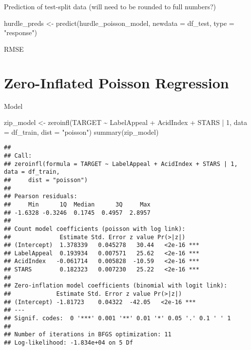 \documentclass[
]{article}
\newenvironment{Shaded}{\begin{snugshade}}{\end{snugshade}}
\newcommand{\AttributeTok}[1]{\textcolor[rgb]{0.77,0.63,0.00}{#1}}
\newcommand{\DecValTok}[1]{\textcolor[rgb]{0.00,0.00,0.81}{#1}}
\newcommand{\FunctionTok}[1]{\textcolor[rgb]{0.00,0.00,0.00}{#1}}
\newcommand{\NormalTok}[1]{#1}
\newcommand{\OtherTok}[1]{\textcolor[rgb]{0.56,0.35,0.01}{#1}}
\newcommand{\SpecialCharTok}[1]{\textcolor[rgb]{0.00,0.00,0.00}{#1}}
\newcommand{\StringTok}[1]{\textcolor[rgb]{0.31,0.60,0.02}{#1}}
\begin{document}
Prediction of test-split data (will need to be rounded to full numbers?)

\begin{Shaded}
\begin{Highlighting}[]
\NormalTok{hurdle\_preds }\OtherTok{\textless{}{-}} \FunctionTok{predict}\NormalTok{(hurdle\_poisson\_model, }\AttributeTok{newdata =}\NormalTok{ df\_test, }\AttributeTok{type =} \StringTok{"response"}\NormalTok{)}
\end{Highlighting}
\end{Shaded}

RMSE

\begin{Shaded}
\end{Shaded}

\hypertarget{zero-inflated-poisson-regression}{%
\section{Zero-Inflated Poisson
Regression}\label{zero-inflated-poisson-regression}}

Model

\begin{Shaded}
\begin{Highlighting}[]
\NormalTok{zip\_model }\OtherTok{\textless{}{-}} \FunctionTok{zeroinfl}\NormalTok{(TARGET }\SpecialCharTok{\textasciitilde{}}\NormalTok{ LabelAppeal }\SpecialCharTok{+}\NormalTok{ AcidIndex }\SpecialCharTok{+}\NormalTok{ STARS }\SpecialCharTok{|} \DecValTok{1}\NormalTok{, }\AttributeTok{data =}\NormalTok{ df\_train, }\AttributeTok{dist =} \StringTok{"poisson"}\NormalTok{)}
\FunctionTok{summary}\NormalTok{(zip\_model)}
\end{Highlighting}
\end{Shaded}

\begin{verbatim}
## 
## Call:
## zeroinfl(formula = TARGET ~ LabelAppeal + AcidIndex + STARS | 1, data = df_train, 
##     dist = "poisson")
## 
## Pearson residuals:
##     Min      1Q  Median      3Q     Max 
## -1.6328 -0.3246  0.1745  0.4957  2.8957 
## 
## Count model coefficients (poisson with log link):
##              Estimate Std. Error z value Pr(>|z|)    
## (Intercept)  1.378339   0.045278   30.44   <2e-16 ***
## LabelAppeal  0.193934   0.007571   25.62   <2e-16 ***
## AcidIndex   -0.061714   0.005828  -10.59   <2e-16 ***
## STARS        0.182323   0.007230   25.22   <2e-16 ***
## 
## Zero-inflation model coefficients (binomial with logit link):
##             Estimate Std. Error z value Pr(>|z|)    
## (Intercept) -1.81723    0.04322  -42.05   <2e-16 ***
## ---
## Signif. codes:  0 '***' 0.001 '**' 0.01 '*' 0.05 '.' 0.1 ' ' 1 
## 
## Number of iterations in BFGS optimization: 11 
## Log-likelihood: -1.834e+04 on 5 Df
\end{verbatim}
\end{document}
